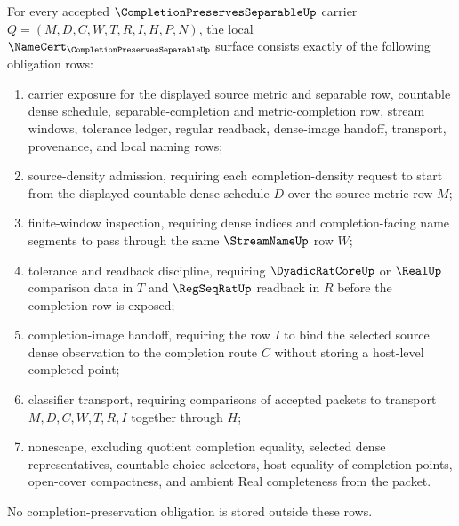 \begin{theorem}\label{thm:completion-preserves-separable-namecert-obligations}
For every accepted $\CompletionPreservesSeparableUp$ carrier $Q=(M,D,C,W,T,R,I,H,P,N)$, the local $\NameCert_{\CompletionPreservesSeparableUp}$ surface consists exactly of the following obligation rows:
\begin{enumerate}
\item carrier exposure for the displayed source metric and separable row, countable dense schedule, separable-completion and metric-completion row, stream windows, tolerance ledger, regular readback, dense-image handoff, transport, provenance, and local naming rows;
\item source-density admission, requiring each completion-density request to start from the displayed countable dense schedule $D$ over the source metric row $M$;
\item finite-window inspection, requiring dense indices and completion-facing name segments to pass through the same $\StreamNameUp$ row $W$;
\item tolerance and readback discipline, requiring $\DyadicRatCoreUp$ or $\RealUp$ comparison data in $T$ and $\RegSeqRatUp$ readback in $R$ before the completion row is exposed;
\item completion-image handoff, requiring the row $I$ to bind the selected source dense observation to the completion route $C$ without storing a host-level completed point;
\item classifier transport, requiring comparisons of accepted packets to transport $M,D,C,W,T,R,I$ together through $H$;
\item nonescape, excluding quotient completion equality, selected dense representatives, countable-choice selectors, host equality of completion points, open-cover compactness, and ambient Real completeness from the packet.
\end{enumerate}
No completion-preservation obligation is stored outside these rows.
\end{theorem}
